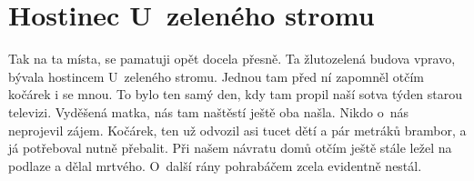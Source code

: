 
\chapter{Hostinec U~zeleného stromu}

Tak na ta místa, se pamatuji opět docela přesně. Ta žlutozelená budova
vpravo, bývala hostincem U~zeleného stromu. %
Jednou tam před ní zapomněl otčím kočárek i se mnou. To bylo ten samý
den, kdy tam propil naší sotva týden starou televizi. Vyděšená matka,
nás tam naštěstí ještě oba našla. Nikdo o~nás neprojevil zájem.
Kočárek, ten už odvozil asi tucet dětí a pár metráků brambor, a já
potřeboval nutně přebalit. Při našem návratu domů otčím ještě stále
ležel na podlaze a dělal mrtvého. O~další rány pohrabáčem zcela
evidentně nestál.
